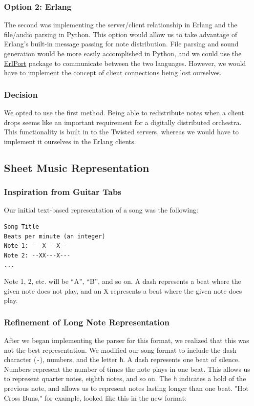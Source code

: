 \documentclass[12pt, letterpaper]{article}
\begin{document}
\subsubsection{Option 2: Erlang}
The second was implementing the server/client relationship in Erlang and the file/audio parsing in
Python. This option would allow us to take advantage of Erlang’s built-in message passing for note
distribution. File parsing and sound generation would be more easily accomplished in Python, and we
could use the \href{http://erlport.org/docs/python.html}{ErlPort} package to communicate between the
two languages. However, we would have to implement the concept of client connections being lost
ourselves.
            
\subsubsection{Decision}
We opted to use the first method. Being able to redistribute notes when a client drops seems like an
important requirement for a digitally distributed orchestra. This functionality is built in to the
Twisted servers, whereas we would have to implement it ourselves in the Erlang clients.

\subsection{Sheet Music Representation}
        
\subsubsection{Inspiration from Guitar Tabs}
Our initial text-based representation of a song was the following:
            
\begin{verbatim}
Song Title
Beats per minute (an integer)
Note 1: ---X---X---
Note 2: --XX---X---
...
\end{verbatim}
            
Note 1, 2, etc. will be “A”, “B”, and so on. A dash represents a beat where the given note does not
play, and an X represents a beat where the given note does play.
            
\subsubsection{Refinement of Long Note Representation}
After we began implementing the parser for this format, we realized that this was not the best
representation. We modified our song format to include the dash character (\texttt{-}), numbers, and
the letter \texttt{h}. A dash represents one beat of silence. Numbers represent the number of times
the note plays in one beat. This allows us to represent quarter notes, eighth notes, and so on. The
\texttt{h} indicates a hold of the previous note, and allows us to represent notes lasting longer
than one beat. "Hot Cross Buns," for example, looked like this in the new format:
            
\end{document}
